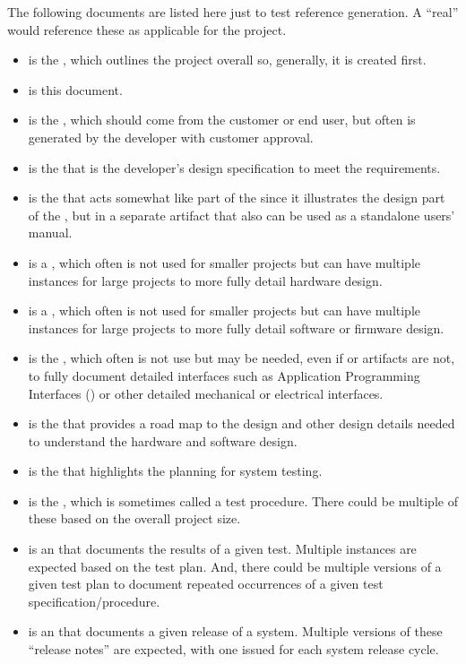 The following documents are listed here just to test reference generation.
A ``real'' \SDP would reference these as applicable for the project.
\begin{itemize}
	\item \citeExProjOCD is the \OCD, which outlines the project overall so, generally, it is created first.
	\item \citeExProjSDP is this document.
	\item \citeExProjSPS is the \SPS, which should come from the customer or end user, but often is generated by the developer with customer approval.
	\item \citeExProjSSS is the \SSS that is the developer's design specification to meet the \SPS requirements.
	\item \citeExProjSUM is the \SUM that acts somewhat like part of the \SSS since it illustrates the \UI design part of the \SSS, but in a separate artifact that also can be used as a standalone users' manual.
	\item \citeExProjHRS is a \HRS, which often is not used for smaller projects but can have multiple instances for large projects to more fully detail hardware design.	
	\item \citeExProjSRS is a \SRS, which often is not used for smaller projects but can have multiple instances for large projects to more fully detail software or firmware design.
	\item \citeExProjIRS is the \IRS, which often is not use but may be needed, even if \HRS or \SRS artifacts are not, to fully document detailed interfaces such as Application Programming Interfaces (\APIs) or other detailed mechanical or electrical interfaces.
	\item \citeExProjSSDD is the \SSDD that provides a road map to the design and other design details needed to understand the hardware and software design.
	\item \citeExProjSTP is the \STP that highlights the planning for system testing.
	\item \citeExProjSTS is the \STS, which is sometimes called a test procedure. There could be multiple of these based on the overall project size.
	\item \citeExProjSTR is an \STR that documents the results of a given test. Multiple instances are expected based on the test plan. And, there could be multiple versions of a given test plan to document repeated occurrences of a given test specification/procedure.
	\item \citeExProjSVD is an \SVD that documents a given release of a system. Multiple versions of these ``release notes'' are expected, with one \SVD issued for each system release cycle.

\end{itemize}




